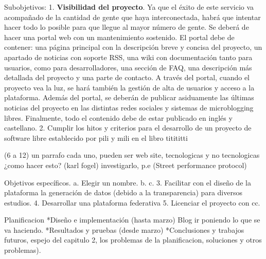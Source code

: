 Subobjetivos:
1. \textbf{Visibilidad del proyecto}. Ya que el éxito de este servicio va acompañado de la cantidad de gente que haya interconectada, habrá que intentar hacer todo lo posible para que llegue al mayor número de gente. Se deberá de hacer una portal web con un mantenimiento sostenido. El portal debe de contener: una página principal con la descripción breve y concisa del proyecto, un apartado de noticias con soporte RSS, una wiki con documentación tanto para usuarios, como para desarrolladores, una sección de FAQ, una descripción más detallada del proyecto y una parte de contacto. A través del portal, cuando el proyecto vea la luz, se hará también la gestión de alta de usuarios y acceso a la plataforma. Además del portal, se deberán de publicar asiduamente las últimas noticias del proyecto en las distintas redes sociales y sistemas de microblogging libres. Finalmente, todo el contenido debe de estar publicado en inglés y castellano.
2. Cumplir los hitos y criterios para el desarrollo de un proyecto de software libre establecido por  pili y mili en el libro titititti
 
(6 a 12) un parrafo cada uno, pueden ser web site, tecnologicas y no tecnologicas ¿como hacer esto? (karl fogel) investigarlo, p.e (Street performance protocol)

Objetivos específicos.
a. Elegir un nombre.
b. 
c. 
3. Facilitar con el diseño de la plataforma la generación de datos (debido a la transparencia) para diversos estudios.
4. Desarrollar una plataforma federativa
5. Licenciar el proyecto con cc.

Planificacion
*Diseño e implementación (hasta marzo) Blog ir poniendo lo que se va haciendo.
*Resultados y pruebas (desde marzo)
*Conclusiones y trabajos futuros, espejo del capitulo 2, los problemas de la planificacion, soluciones y otros problemas).
